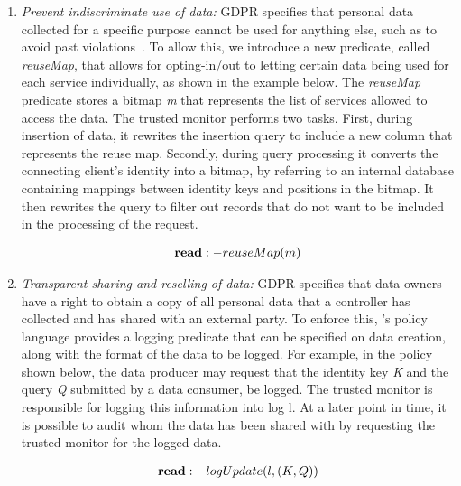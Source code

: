 \begin{enumerate}[wide=0pt]
\item {\em Prevent indiscriminate use of data: } GDPR specifies that personal data collected for a specific purpose cannot be used for anything else, such as to avoid past violations~\cite{french-fine-google}.
To allow this, we introduce a new predicate, called \textit{reuseMap}, that allows for opting-in/out to letting certain data being used for each service individually, as shown in the example below. The \textit{reuseMap} predicate stores a bitmap \textit{m} that represents the list of services allowed to access the data. The trusted monitor performs two tasks. First, during insertion of data, it rewrites the insertion query to include a new column that represents the reuse map. Secondly, during query processing it converts the connecting client's identity into a bitmap, by referring to an internal database containing mappings between identity keys and positions in the bitmap. It then rewrites the query to filter out records that do not want to be included in the processing of the request.

\vspace{-4mm}
\[
 \begin{array}{@{}l@{}}
 \textbf{read}:-reuseMap(m)
 \end{array}
\]
\vspace{-4mm}

\item {\em Transparent sharing and reselling of data:} 
GDPR specifies that data owners have a right to obtain a copy of all personal data that a controller has collected and has shared with an external party. To enforce this, \project{}'s policy language provides a logging predicate that can be specified on data creation, along with the format of the data to be logged. For example, in the policy shown below, the data producer may request that the identity key \textit{K} and the query \textit{Q} submitted by a data consumer, be logged. The trusted monitor is responsible for logging this information into log l. At a later point in time, it is possible to audit whom the data has been shared with by requesting the trusted monitor for the logged data.

\vspace{-3.5mm}
\[
 \begin{array}{@{}l@{}}
 \textbf{read}:-logUpdate(l, (K, Q))
 \end{array}
\]
\vspace{-3.5mm}


\end{enumerate}
